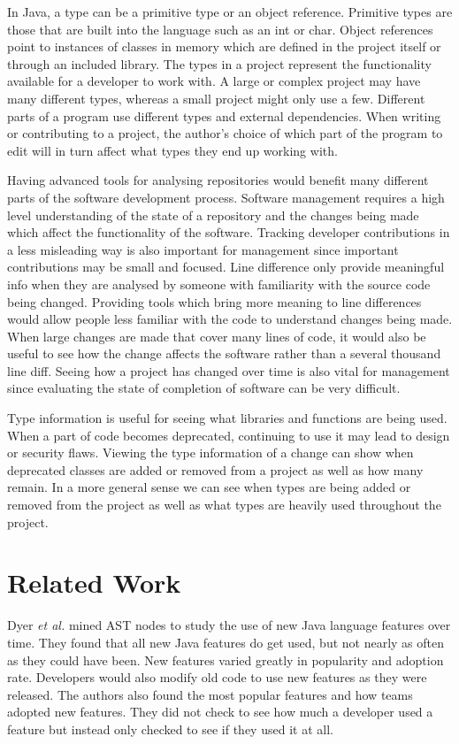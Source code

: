 \documentclass[conference]{IEEEtran}
\begin{document}
In Java, a type can be a primitive type or an object reference. Primitive types are those that are built into the language such as an int or char. Object references point to instances of classes in memory which are defined in the project itself or through an included library. The types in a project represent the functionality available for a developer to work with. A large or complex project may have many different types, whereas a small project might only use a few. Different parts of a program use different types and external dependencies. When writing or contributing to a project, the author’s choice of which part of the program to edit will in turn affect what types they end up working with.

Having advanced tools for analysing repositories would benefit many different parts of the software development process. Software management requires a high level understanding of the state of a repository and the changes being made which affect the functionality of the software. Tracking developer contributions in a less misleading way is also important for management since important contributions may be small and focused. Line difference only provide meaningful info when they are analysed by someone with familiarity with the source code being changed. Providing tools which bring more meaning to line differences would allow people less familiar with the code to understand changes being made. When large changes are made that cover many lines of code, it would also be useful to see how the change affects the software rather than a several thousand line diff.  Seeing how a project has changed over time is also vital for management since evaluating the state of completion of software can be very difficult.

Type information is useful for seeing what libraries and functions are being used.  When a part of code becomes deprecated, continuing to use it may lead to design or security flaws. Viewing the type information of a change can show when deprecated classes are added or removed from a project as well as how many remain. In a more general sense we can see when types are being added or removed from the project as well as what types are heavily used throughout the project.

\section{Related Work}

Dyer \textit{et al.} \cite{Dyer:2014:MBA:2568225.2568295} mined AST nodes to study the use of new Java language features over time. They found that all new Java features do get used, but not nearly as often as they could have been. New features varied greatly in popularity and adoption rate. Developers would also modify old code to use new features as they were released. The authors also found the most popular features and how teams adopted new features. They did not check to see how much a developer used a feature but instead only checked to see if they used it at all.
\end{document}
